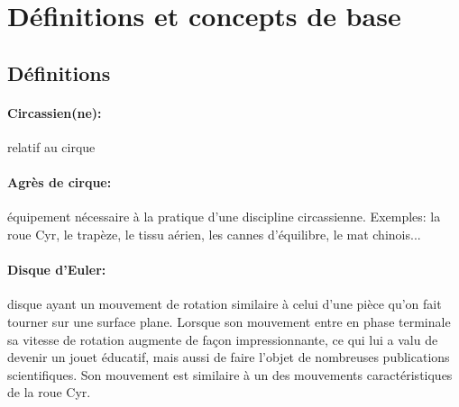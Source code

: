 \section{Définitions et concepts de base}  %



\subsection{Définitions}
\paragraph{Circassien(ne):} relatif au cirque 
\paragraph{Agrès de cirque:} équipement nécessaire à la pratique d'une discipline circassienne. Exemples: la roue Cyr, le trapèze, le tissu aérien, les cannes d'équilibre, le mat chinois...
\paragraph{Disque d'Euler:} disque ayant un mouvement de rotation similaire à celui d'une pièce qu'on fait tourner sur une surface plane. Lorsque son mouvement entre en phase terminale sa vitesse de rotation augmente de façon impressionnante, ce qui lui a valu de devenir un jouet éducatif, mais aussi de faire l'objet de nombreuses publications scientifiques. Son mouvement est similaire à un des mouvements caractéristiques de la roue Cyr.


